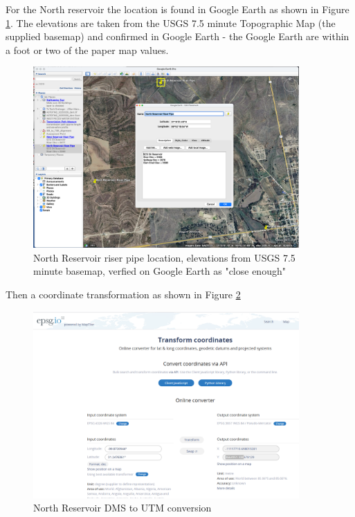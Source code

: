 \documentclass[12pt]{article}
\begin{document}
\begin{enumerate}
\clearpage

For the North reservoir the location is found in Google Earth as shown in Figure \ref{fig:NorthBasin}.  The elevations are taken from the USGS 7.5 minute Topographic Map (the supplied basemap) and confirmed in Google Earth - the Google Earth are within a foot or two of the paper map values.

\begin{figure}[h!] %
   \centering
   \includegraphics[width=4in]{NorthReservoir.png} 
   \caption{North Reservoir riser pipe location, elevations from USGS 7.5 minute basemap, verfied on Google Earth as "close enough"}
   \label{fig:NorthBasin}
\end{figure}

Then a coordinate transformation as shown in Figure \ref{fig:NorthCoordinates}

\begin{figure}[h!] %
   \centering
   \includegraphics[width=4in]{NorthCoordinates.png} 
   \caption{North Reservoir DMS to UTM conversion}
   \label{fig:NorthCoordinates}
\end{figure}


\end{enumerate}
\end{document}

